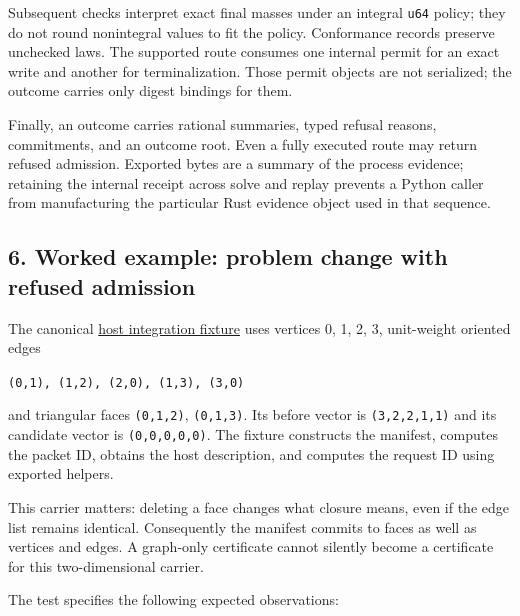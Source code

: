 \documentclass[
  11pt,
]{article}
\newcommand{\passthrough}[1]{#1}
\begin{document}
Subsequent checks interpret exact final masses under an integral
\passthrough{\lstinline!u64!} policy; they do not round nonintegral
values to fit the policy. Conformance records preserve unchecked laws.
The supported route consumes one internal permit for an exact write and
another for terminalization. Those permit objects are not serialized;
the outcome carries only digest bindings for them.

Finally, an outcome carries rational summaries, typed refusal reasons,
commitments, and an outcome root. Even a fully executed route may return
refused admission. Exported bytes are a summary of the process evidence;
retaining the internal receipt across solve and replay prevents a Python
caller from manufacturing the particular Rust evidence object used in
that sequence.

\subsection{6. Worked example: problem change with refused
admission}\label{worked-example-problem-change-with-refused-admission}

The canonical
\href{https://github.com/dbccpage/the_symbol_game/blob/52cb5457f6c485ba548cfd292f6012a941ed22cf/engine/crates_rs/core_symbol_game/tests/host_contract.rs}{host
integration fixture} uses vertices 0, 1, 2, 3, unit-weight oriented
edges

\passthrough{\lstinline!(0,1), (1,2), (2,0), (1,3), (3,0)!}

and triangular faces \passthrough{\lstinline!(0,1,2)!},
\passthrough{\lstinline!(0,1,3)!}. Its before vector is
\passthrough{\lstinline!(3,2,2,1,1)!} and its candidate vector is
\passthrough{\lstinline!(0,0,0,0,0)!}. The fixture constructs the
manifest, computes the packet ID, obtains the host description, and
computes the request ID using exported helpers.

This carrier matters: deleting a face changes what closure means, even
if the edge list remains identical. Consequently the manifest commits to
faces as well as vertices and edges. A graph-only certificate cannot
silently become a certificate for this two-dimensional carrier.

The test specifies the following expected observations:
\end{document}
